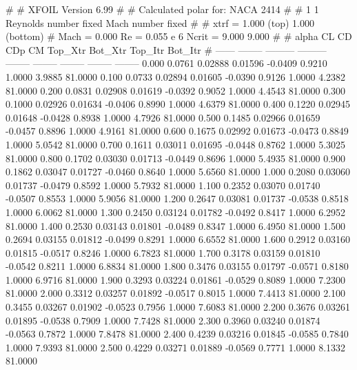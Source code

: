 #  
#       XFOIL         Version 6.99
#  
# Calculated polar for: NACA 2414                                       
#  
# 1 1 Reynolds number fixed          Mach number fixed         
#  
# xtrf =   1.000 (top)        1.000 (bottom)  
# Mach =   0.000     Re =     0.055 e 6     Ncrit =   9.000  9.000
#  
#   alpha    CL        CD       CDp       CM     Top_Xtr  Bot_Xtr  Top_Itr  Bot_Itr
#  ------ -------- --------- --------- -------- -------- -------- -------- --------
   0.000   0.0761   0.02888   0.01596  -0.0409   0.9210   1.0000   3.9885  81.0000
   0.100   0.0733   0.02894   0.01605  -0.0390   0.9126   1.0000   4.2382  81.0000
   0.200   0.0831   0.02908   0.01619  -0.0392   0.9052   1.0000   4.4543  81.0000
   0.300   0.1000   0.02926   0.01634  -0.0406   0.8990   1.0000   4.6379  81.0000
   0.400   0.1220   0.02945   0.01648  -0.0428   0.8938   1.0000   4.7926  81.0000
   0.500   0.1485   0.02966   0.01659  -0.0457   0.8896   1.0000   4.9161  81.0000
   0.600   0.1675   0.02992   0.01673  -0.0473   0.8849   1.0000   5.0542  81.0000
   0.700   0.1611   0.03011   0.01695  -0.0448   0.8762   1.0000   5.3025  81.0000
   0.800   0.1702   0.03030   0.01713  -0.0449   0.8696   1.0000   5.4935  81.0000
   0.900   0.1862   0.03047   0.01727  -0.0460   0.8640   1.0000   5.6560  81.0000
   1.000   0.2080   0.03060   0.01737  -0.0479   0.8592   1.0000   5.7932  81.0000
   1.100   0.2352   0.03070   0.01740  -0.0507   0.8553   1.0000   5.9056  81.0000
   1.200   0.2647   0.03081   0.01737  -0.0538   0.8518   1.0000   6.0062  81.0000
   1.300   0.2450   0.03124   0.01782  -0.0492   0.8417   1.0000   6.2952  81.0000
   1.400   0.2530   0.03143   0.01801  -0.0489   0.8347   1.0000   6.4950  81.0000
   1.500   0.2694   0.03155   0.01812  -0.0499   0.8291   1.0000   6.6552  81.0000
   1.600   0.2912   0.03160   0.01815  -0.0517   0.8246   1.0000   6.7823  81.0000
   1.700   0.3178   0.03159   0.01810  -0.0542   0.8211   1.0000   6.8834  81.0000
   1.800   0.3476   0.03155   0.01797  -0.0571   0.8180   1.0000   6.9716  81.0000
   1.900   0.3293   0.03224   0.01861  -0.0529   0.8089   1.0000   7.2300  81.0000
   2.000   0.3312   0.03257   0.01892  -0.0517   0.8015   1.0000   7.4413  81.0000
   2.100   0.3455   0.03267   0.01902  -0.0523   0.7956   1.0000   7.6083  81.0000
   2.200   0.3676   0.03261   0.01895  -0.0538   0.7909   1.0000   7.7428  81.0000
   2.300   0.3960   0.03240   0.01874  -0.0563   0.7872   1.0000   7.8478  81.0000
   2.400   0.4239   0.03216   0.01845  -0.0585   0.7840   1.0000   7.9393  81.0000
   2.500   0.4229   0.03271   0.01889  -0.0569   0.7771   1.0000   8.1332  81.0000
